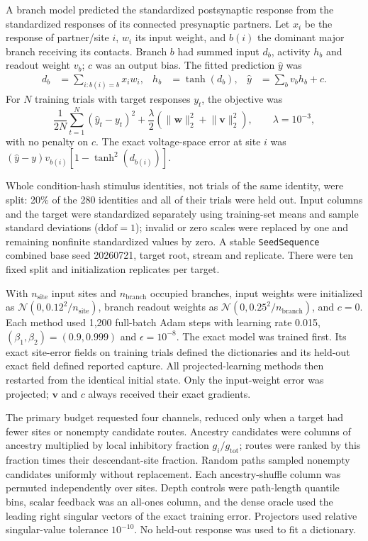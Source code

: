 A branch model predicted the standardized postsynaptic response from the
standardized responses of its connected presynaptic partners. Let $x_i$ be the
response of partner/site $i$, $w_i$ its input weight, and $b(i)$ the dominant
major branch receiving its contacts. Branch $b$ had summed input $d_b$,
activity $h_b$ and readout weight $v_b$; $c$ was an output bias. The fitted
prediction $\widehat y$ was
\begin{align}
d_b&=\sum_{i:b(i)=b}x_iw_i,
&h_b&=\tanh(d_b),
&\widehat y&=\sum_bv_bh_b+c.
\label{eq:s_branch_model}
\end{align}
For $N$ training trials with target responses $y_t$, the objective was
\begin{equation}
\frac{1}{2N}\sum_{t=1}^{N}(\widehat y_t-y_t)^2+
\frac{\lambda}{2}(\lVert\bm w\rVert_2^2+\lVert\bm v\rVert_2^2),
\qquad \lambda=10^{-3},
\label{eq:s_branch_objective}
\end{equation}
with no penalty on $c$. The exact voltage-space error at site $i$ was
$(\widehat y-y)v_{b(i)}[1-\tanh^2(d_{b(i)})]$.

Whole condition-hash stimulus identities, not trials of the same identity,
were split: 20\% of the 280 identities and all of their trials were held out.
Input columns and the target were standardized separately using training-set
means and sample standard deviations ($\mathrm{ddof}=1$); invalid or zero
scales were replaced by one and remaining nonfinite standardized values by
zero. A stable \texttt{SeedSequence} combined base seed 20260721, target root,
stream and replicate. There were ten fixed split and initialization replicates
per target.

With $n_{\mathrm{site}}$ input sites and $n_{\mathrm{branch}}$ occupied
branches, input weights were initialized as
$\mathcal N(0,0.12^2/n_{\mathrm{site}})$, branch readout weights as
$\mathcal N(0,0.25^2/n_{\mathrm{branch}})$, and $c=0$. Each method used
1,200 full-batch Adam steps with learning rate 0.015,
$(\beta_1,\beta_2)=(0.9,0.999)$ and $\epsilon=10^{-8}$. The exact model was
trained first. Its exact site-error fields on training trials defined the
dictionaries and its held-out exact field defined reported capture. All
projected-learning methods then restarted from the identical initial state.
Only the input-weight error was projected; $\bm v$ and $c$ always received
their exact gradients.

The primary budget requested four channels, reduced only when a target had
fewer sites or nonempty candidate routes. Ancestry candidates were columns
of ancestry multiplied by local inhibitory fraction $g_i/g_{\mathrm{tot}}$;
routes were ranked by this fraction times their descendant-site fraction.
Random paths sampled nonempty candidates uniformly without replacement.
Each ancestry-shuffle column was permuted independently over sites. Depth
controls were path-length quantile bins, scalar feedback was an all-ones
column, and the dense oracle used the leading right singular vectors of the
exact training error. Projectors used relative singular-value tolerance
$10^{-10}$. No held-out response was used to fit a dictionary.

